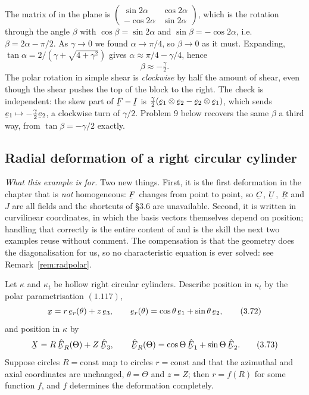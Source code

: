 \begin{remark}\label{rem:backwards}
The matrix of  in the plane is
$\begin{pmatrix}\sin2\alpha&\cos2\alpha\\ -\cos2\alpha&\sin2\alpha
\end{pmatrix}$, which is the rotation through the angle $\beta$ with
$\cos\beta=\sin2\alpha$ and $\sin\beta=-\cos2\alpha$, i.e.\
$\beta=2\alpha-\pi/2$. As $\gamma\to0$ we found $\alpha\to\pi/4$, so
$\beta\to0$ as it must. Expanding, $\tan\alpha=2/(\gamma+
\sqrt{4+\gamma^{2}})$ gives $\alpha\approx\pi/4-\gamma/4$, hence
\[
   \beta\approx-\tfrac{\gamma}{2}.
\]
The polar rotation in simple shear is \emph{clockwise} by half the amount
of shear, even though the shear pushes the top of the block to the right.
The check is independent: the skew part of $\bF-\I$ is
$\tfrac{\gamma}{2}(\be_{1}\otimes\be_{2}-\be_{2}\otimes\be_{1})$, which
sends $\be_{1}\mapsto-\tfrac{\gamma}2\be_{2}$, a clockwise turn of
$\gamma/2$. Problem 9 below recovers the same $\beta$ a third way, from
$\tan\beta=-\gamma/2$ exactly.
\end{remark}

\subsection{Radial deformation of a right circular cylinder}
\label{sec:radial}

\emph{What this example is for.} Two new things. First, it is the first
deformation in the chapter that is \emph{not} homogeneous: $\bF$ changes
from point to point, so $\bC$, $\bU$, $\bR$ and $J$ are all fields and the
shortcuts of \S3.6 are unavailable. Second, it is written in curvilinear
coordinates, in which the basis vectors themselves depend on position;
handling that correctly is the entire content of \eqr{3.74} and is the skill
the next two examples reuse without comment. The compensation is that the
geometry does the diagonalisation for us, so no characteristic equation is
ever solved: see Remark~\ref{rem:radpolar}.

Let $\kappa$ and $\kappa_{t}$ be hollow right circular cylinders. Describe
position in $\kappa_{t}$ by the polar parametrisation $(1.117)$,
\begin{equation}
   \bx=r\,\ber(\theta)+z\,\be_{3},\qquad
   \ber(\theta)=\cos\theta\,\be_{1}+\sin\theta\,\be_{2},
   \tag{3.72}\label{eq:3.72}
\end{equation}
and position in $\kappa$ by
\begin{equation}
   \bX=R\,\hER(\Theta)+Z\,\hbE_{3},\qquad
   \hER(\Theta)=\cos\Theta\,\hbE_{1}+\sin\Theta\,\hbE_{2}.
   \tag{3.73}\label{eq:3.73}
\end{equation}
Suppose circles $R=\text{const}$ map to circles $r=\text{const}$ and that
the azimuthal and axial coordinates are unchanged, $\theta=\Theta$ and
$z=Z$; then $r=f(R)$ for some function $f$, and $f$ determines the
deformation completely.

